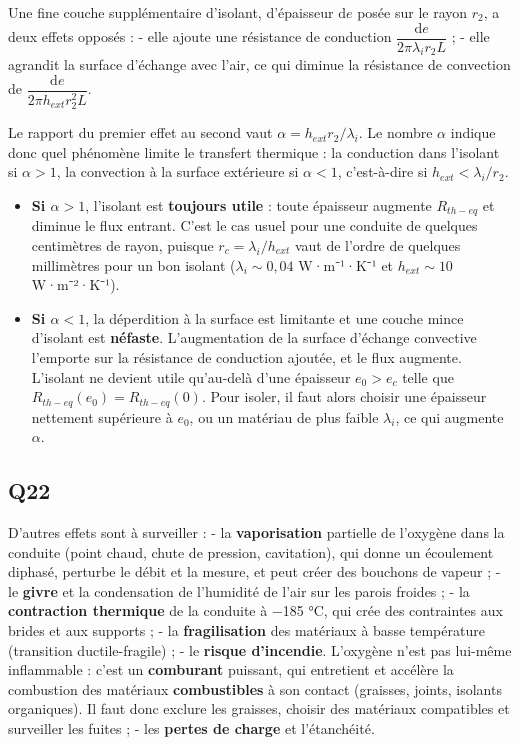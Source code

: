 \documentclass[11pt,a4paper]{article}
\providecommand{\tightlist}{\setlength{\itemsep}{0pt}\setlength{\parskip}{0pt}}
\begin{document}
Une fine couche supplémentaire d'isolant, d'épaisseur \(\mathrm{d}e\) posée sur le rayon \(r_2\), a deux effets opposés :
- elle ajoute une résistance de conduction \(\dfrac{\mathrm{d}e}{2\pi\lambda_i r_2L}\) ;
- elle agrandit la surface d'échange avec l'air, ce qui diminue la résistance de convection de \(\dfrac{\mathrm{d}e}{2\pi h_{ext}r_2^2L}\).

Le rapport du premier effet au second vaut \(\alpha=h_{ext}r_2/\lambda_i\). Le nombre \(\alpha\) indique donc quel phénomène limite le transfert thermique : la conduction dans l'isolant si \(\alpha>1\), la convection à la surface extérieure si \(\alpha<1\), c'est-à-dire si \(h_{ext}<\lambda_i/r_2\).

\begin{itemize}
\tightlist
\item
  \textbf{Si \(\alpha>1\)}, l'isolant est \textbf{toujours utile} : toute épaisseur augmente \(R_{th-eq}\) et diminue le flux entrant. C'est le cas usuel pour une conduite de quelques centimètres de rayon, puisque \(r_c=\lambda_i/h_{ext}\) vaut de l'ordre de quelques millimètres pour un bon isolant (\(\lambda_i\sim0{,}04\) W·m⁻¹·K⁻¹ et \(h_{ext}\sim10\) W·m⁻²·K⁻¹).
\item
  \textbf{Si \(\alpha<1\)}, la déperdition à la surface est limitante et une couche mince d'isolant est \textbf{néfaste}. L'augmentation de la surface d'échange convective l'emporte sur la résistance de conduction ajoutée, et le flux augmente. L'isolant ne devient utile qu'au-delà d'une épaisseur \(e_0>e_c\) telle que \(R_{th-eq}(e_0)=R_{th-eq}(0)\). Pour isoler, il faut alors choisir une épaisseur nettement supérieure à \(e_0\), ou un matériau de plus faible \(\lambda_i\), ce qui augmente \(\alpha\).
\end{itemize}

\hypertarget{q22}{%
\subsection{Q22}\label{q22}}

D'autres effets sont à surveiller :
- la \textbf{vaporisation} partielle de l'oxygène dans la conduite (point chaud, chute de pression, cavitation), qui donne un écoulement diphasé, perturbe le débit et la mesure, et peut créer des bouchons de vapeur ;
- le \textbf{givre} et la condensation de l'humidité de l'air sur les parois froides ;
- la \textbf{contraction thermique} de la conduite à −185 °C, qui crée des contraintes aux brides et aux supports ;
- la \textbf{fragilisation} des matériaux à basse température (transition ductile-fragile) ;
- le \textbf{risque d'incendie}. L'oxygène n'est pas lui-même inflammable : c'est un \textbf{comburant} puissant, qui entretient et accélère la combustion des matériaux \textbf{combustibles} à son contact (graisses, joints, isolants organiques). Il faut donc exclure les graisses, choisir des matériaux compatibles et surveiller les fuites ;
- les \textbf{pertes de charge} et l'étanchéité.
\end{document}
